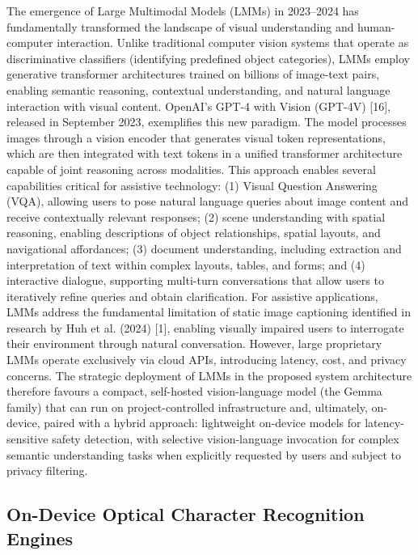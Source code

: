 \documentclass[a4paper]{report}
\begin{document}
The emergence of Large Multimodal Models (LMMs) in 2023--2024 has fundamentally transformed the landscape of visual understanding and human-computer interaction. Unlike traditional computer vision systems that operate as discriminative classifiers (identifying predefined object categories), LMMs employ generative transformer architectures trained on billions of image-text pairs, enabling semantic reasoning, contextual understanding, and natural language interaction with visual content. OpenAI's GPT-4 with Vision (GPT-4V) [16], released in September 2023, exemplifies this new paradigm. The model processes images through a vision encoder that generates visual token representations, which are then integrated with text tokens in a unified transformer architecture capable of joint reasoning across modalities. This approach enables several capabilities critical for assistive technology: (1) Visual Question Answering (VQA), allowing users to pose natural language queries about image content and receive contextually relevant responses; (2) scene understanding with spatial reasoning, enabling descriptions of object relationships, spatial layouts, and navigational affordances; (3) document understanding, including extraction and interpretation of text within complex layouts, tables, and forms; and (4) interactive dialogue, supporting multi-turn conversations that allow users to iteratively refine queries and obtain clarification. For assistive applications, LMMs address the fundamental limitation of static image captioning identified in research by Huh et al. (2024) [1], enabling visually impaired users to interrogate their environment through natural conversation. However, large proprietary LMMs operate exclusively via cloud APIs, introducing latency, cost, and privacy concerns. The strategic deployment of LMMs in the proposed system architecture therefore favours a compact, self-hosted vision-language model (the Gemma family) that can run on project-controlled infrastructure and, ultimately, on-device, paired with a hybrid approach: lightweight on-device models for latency-sensitive safety detection, with selective vision-language invocation for complex semantic understanding tasks when explicitly requested by users and subject to privacy filtering.

\subsection{On-Device Optical Character Recognition Engines}
\end{document}
